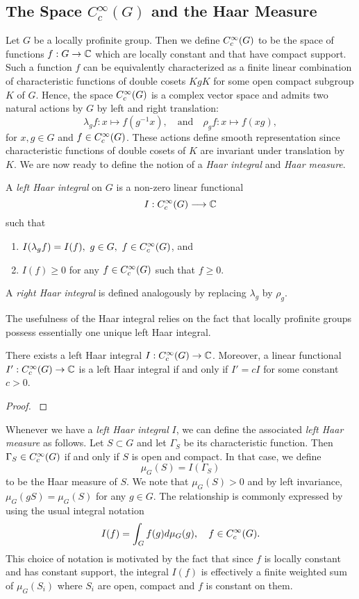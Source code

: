 \subsection{The Space \texorpdfstring{$C_c^{\infty}(G)$}{TEXT} and the Haar Measure}

Let $G$ be a locally profinite group. Then we define $C_c^{\infty}(G)$ to be the space of functions $f:G\to\mathbb{C}$ which are locally constant and that have compact support. Such a function $f$ can be equivalently characterized as a finite linear combination of characteristic functions of double cosets $KgK$ for some open compact subgroup $K$ of $G$. Hence, the space $C_c^{\infty}(G)$ is a complex vector space and admits two natural actions by $G$ by left and right translation:
$$\lambda_g f:x\longmapsto f(g^{-1}x),\quad\text{and}\quad \rho_g f:x\longmapsto f(xg),$$
for $x,g\in G$ and $f\in C_c^{\infty}(G)$. These actions define smooth representation since characteristic functions of double cosets of $K$ are invariant under translation by $K$. We are now ready to define the notion of a \textit{Haar integral} and \textit{Haar measure}.

\begin{defn}
    A \textit{left Haar integral} on $G$ is a non-zero linear functional 
    $$I:C_c^{\infty}(G)\longrightarrow \mathbb{C}$$
    such that
    \begin{enumerate}[(1)]
        \item $I(\lambda_g f)=I(f),\ g\in G,\ f\in\CG$, and
        \item $I(f)\geq 0$ for any $f\in C_c^{\infty}(G)$ such that $f\geq 0$.
    \end{enumerate}
    A \textit{right Haar integral} is defined analogously by replacing $\lambda_g$ by $\rho_g$.
\end{defn}

The usefulness of the Haar integral relies on the fact that locally profinite groups possess essentially one unique left Haar integral.

\begin{prop}\label{prop:haar}
    There exists a left Haar integral $I:C_c^{\infty}(G)\to\mathbb{C}$. Moreover, a linear functional $I':C_c^{\infty}(G)\to\mathbb{C}$ is a left Haar integral if and only if $I'=cI$ for some constant $c>0$.
\end{prop}
\begin{proof}
    \cite[3.1 Proposition]{BH1}
\end{proof}

Whenever we have a \textit{left Haar integral} $I$, we can define the associated \textit{left Haar measure} as follows. Let $S\subset G$ and let $\Gamma_S$ be its characteristic function. Then $\Gamma_S\in C_c^{\infty}(G)$ if and only if $S$ is open and compact. In that case, we define $$\mu_G(S)=I(\Gamma_S)$$ to be the Haar measure of $S$. We note that $\mu_G(S)>0$ and by left invariance, $\mu_G(gS)=\mu_G(S)$ for any $g\in G$. The relationship is commonly expressed by using the usual integral notation
$$I(f)=\int_G f(g)d\mu_G(g),\quad f\in C_c^{\infty}(G).$$
This choice of notation is motivated by the fact that since $f$ is locally constant and has constant support, the integral $I(f)$ is effectively a finite weighted sum of $\mu_G(S_i)$ where $S_i$ are open, compact and $f$ is constant on them. 

